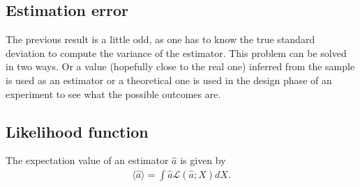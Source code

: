 {\subsection{Estimation error}

    \begin{remark}
        The previous result is a little odd, as one has to know the true standard deviation to compute the variance of the estimator. This problem can be solved in two ways. Or a value (hopefully close to the real one) inferred from the sample is used as an estimator or a theoretical one is used in the design phase of an experiment to see what the possible outcomes are.
    \end{remark}

\subsection{Likelihood function}


    \begin{property}
        The expectation value of an estimator $\hat{a}$ is given by
        \begin{gather}
            \langle\hat{a}\rangle = \int \hat{a}\mathcal{L}(\hat{a};X)dX.
        \end{gather}
    \end{property}

}

